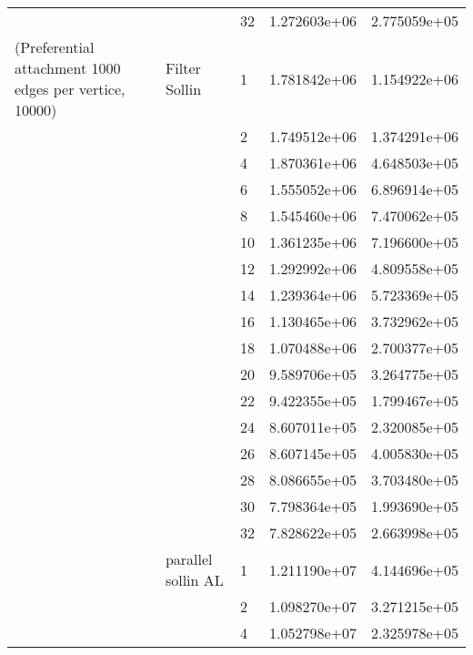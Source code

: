 \begin{tabular}{lllrr}
                      &                     & 32 &  1.272603e+06 &  2.775059e+05 \\
(Preferential attachment 1000 edges per vertice, 10000) & Filter Sollin & 1  &  1.781842e+06 &  1.154922e+06 \\
                      &                     & 2  &  1.749512e+06 &  1.374291e+06 \\
                      &                     & 4  &  1.870361e+06 &  4.648503e+05 \\
                      &                     & 6  &  1.555052e+06 &  6.896914e+05 \\
                      &                     & 8  &  1.545460e+06 &  7.470062e+05 \\
                      &                     & 10 &  1.361235e+06 &  7.196600e+05 \\
                      &                     & 12 &  1.292992e+06 &  4.809558e+05 \\
                      &                     & 14 &  1.239364e+06 &  5.723369e+05 \\
                      &                     & 16 &  1.130465e+06 &  3.732962e+05 \\
                      &                     & 18 &  1.070488e+06 &  2.700377e+05 \\
                      &                     & 20 &  9.589706e+05 &  3.264775e+05 \\
                      &                     & 22 &  9.422355e+05 &  1.799467e+05 \\
                      &                     & 24 &  8.607011e+05 &  2.320085e+05 \\
                      &                     & 26 &  8.607145e+05 &  4.005830e+05 \\
                      &                     & 28 &  8.086655e+05 &  3.703480e+05 \\
                      &                     & 30 &  7.798364e+05 &  1.993690e+05 \\
                      &                     & 32 &  7.828622e+05 &  2.663998e+05 \\
                      & parallel sollin AL & 1  &  1.211190e+07 &  4.144696e+05 \\
                      &                     & 2  &  1.098270e+07 &  3.271215e+05 \\
                      &                     & 4  &  1.052798e+07 &  2.325978e+05 \\

\end{tabular}
